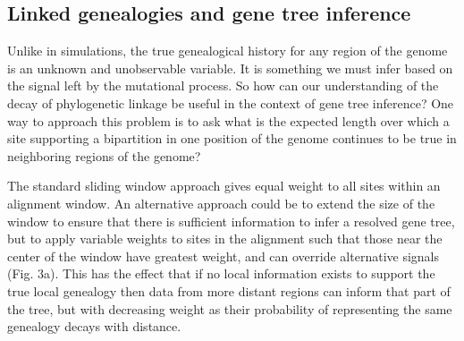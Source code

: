 \documentclass[11pt]{article}
\begin{document}


 
\subsection{Linked genealogies and gene tree inference}

Unlike in simulations, the true genealogical history for any region of the genome is an unknown and unobservable variable. It is something we must infer based on the signal left by the mutational process. So how can our understanding of the decay of phylogenetic linkage be useful in the context of gene tree inference? One way to approach this problem is to ask what is the expected length over which a site supporting a bipartition in one position of the genome continues to be true in neighboring regions of the genome? 

The standard sliding window approach gives equal weight to all sites within an alignment window. An alternative approach could be to extend the size of the window to ensure that there is sufficient information to infer a resolved gene tree, but to apply variable weights to sites in the alignment such that those near the center of the window have greatest weight, and can override alternative signals (Fig. 3a). This has the effect that if no local information exists to support the true local genealogy then data from more distant regions can inform that part of the tree, but with decreasing weight as their probability of representing the same genealogy decays with distance. 
\end{document}
